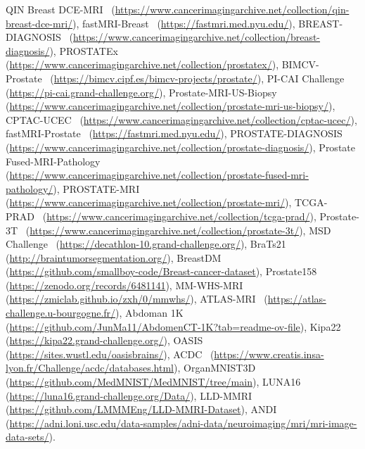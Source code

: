 QIN Breast DCE-MRI~\cite{huang2014variations} (\url{https://www.cancerimagingarchive.net/collection/qin-breast-dce-mri/}),
fastMRI-Breast~\cite{knoll2020fastmri,zbontar2018fastmri} (\url{https://fastmri.med.nyu.edu/}),
BREAST-DIAGNOSIS~\cite{bloch2015breast} (\url{https://www.cancerimagingarchive.net/collection/breast-diagnosis/}),
PROSTATEx~\cite{litjens2017prostatex} (\url{https://www.cancerimagingarchive.net/collection/prostatex/}),
BIMCV-Prostate~\cite{Alzate-Grisales2024} (\url{https://bimcv.cipf.es/bimcv-projects/prostate/}),
PI-CAI Challenge~\cite{saha2024artificial} (\url{https://pi-cai.grand-challenge.org/}),
Prostate-MRI-US-Biopsy~\cite{natarajan2020prostate} (\url{https://www.cancerimagingarchive.net/collection/prostate-mri-us-biopsy/}),
CPTAC-UCEC~\cite{CPTAC2019} (\url{https://www.cancerimagingarchive.net/collection/cptac-ucec/}),
fastMRI-Prostate~\cite{knoll2020fastmri,zbontar2018fastmri} (\url{https://fastmri.med.nyu.edu/}),
PROSTATE-DIAGNOSIS~\cite{bloch2015data} (\url{https://www.cancerimagingarchive.net/collection/prostate-diagnosis/}),
Prostate Fused-MRI-Pathology~\cite{madabhushi2016fused} (\url{https://www.cancerimagingarchive.net/collection/prostate-fused-mri-pathology/}),
PROSTATE-MRI~\cite{choyke2016data} (\url{https://www.cancerimagingarchive.net/collection/prostate-mri/}),
TCGA-PRAD~\cite{Zuley2016} (\url{https://www.cancerimagingarchive.net/collection/tcga-prad/}),
Prostate-3T~\cite{litjens2015data} (\url{https://www.cancerimagingarchive.net/collection/prostate-3t/}),
MSD Challenge~\cite{antonelli2022medical} (\url{https://decathlon-10.grand-challenge.org/}),
BraTs21~\cite{baid2021rsna} (\url{http://braintumorsegmentation.org/}),
BreastDM~\cite{zhao2023breastdm} (\url{https://github.com/smallboy-code/Breast-cancer-dataset}),
Prostate158~\cite{adams2022prostate158} (\url{https://zenodo.org/records/6481141}),
MM-WHS-MRI~\cite{zhuang2018multivariate} (\url{https://zmiclab.github.io/zxh/0/mmwhs/}),
ATLAS-MRI~\cite{quinton2023tumour} (\url{https://atlas-challenge.u-bourgogne.fr/}),
Abdoman 1K~\cite{ma2021abdomenct} (\url{https://github.com/JunMa11/AbdomenCT-1K?tab=readme-ov-file}),
Kipa22~\cite{he2021meta} (\url{https://kipa22.grand-challenge.org/}),
OASIS~\cite{marcus2007open} (\url{https://sites.wustl.edu/oasisbrains/}),
ACDC~\cite{bernard2018deep} (\url{https://www.creatis.insa-lyon.fr/Challenge/acdc/databases.html}),
OrganMNIST3D~\cite{yang2023medmnist} (\url{https://github.com/MedMNIST/MedMNIST/tree/main}),
LUNA16~\cite{setio2017validation} (\url{https://luna16.grand-challenge.org/Data/}),
LLD-MMRI~\cite{lou2024sdrformer} (\url{https://github.com/LMMMEng/LLD-MMRI-Dataset}),
ANDI~\cite{jack2008alzheimer} (\url{https://adni.loni.usc.edu/data-samples/adni-data/neuroimaging/mri/mri-image-data-sets/}).